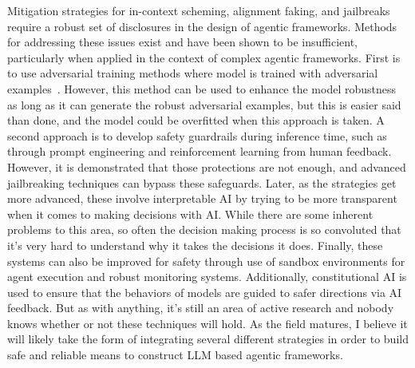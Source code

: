 Mitigation strategies for in-context scheming, alignment faking, and jailbreaks require a robust set of disclosures in the design of agentic frameworks. Methods for addressing these issues exist and have been shown to be insufficient, particularly when applied in the context of complex agentic frameworks. First is to use adversarial training methods where model is trained with adversarial examples~\cite{Goodfellow2014Explaining}. However, this method can be used to enhance the model robustness as long as it can generate the robust adversarial examples, but this is easier said than done, and the model could be overfitted when this approach is taken. A second approach is to develop safety guardrails during inference time, such as through prompt engineering and reinforcement learning from human feedback. However, it is demonstrated that those protections are not enough, and advanced jailbreaking techniques \cite {Ouyang2022Training, Ziegler2019Fine} can bypass these safeguards. Later, as the strategies get more advanced, these involve interpretable AI \cite{Ribeiro2016Why} by trying to be more transparent when it comes to making decisions with AI. While there are some inherent problems to this area, so often the decision making process is so convoluted that it's very hard to understand why it takes the decisions it does. Finally, these systems can also be improved for safety through use of sandbox environments for agent execution and robust monitoring systems. Additionally, constitutional AI \cite{Bai2022Constitutional} is used to ensure that the behaviors of models are guided to safer directions via AI feedback. But as with anything, it’s still an area of active research and nobody knows whether or not these techniques will hold. As the field matures, I believe it will likely take the form of integrating several different strategies in order to build safe and reliable means to construct LLM based agentic frameworks.



